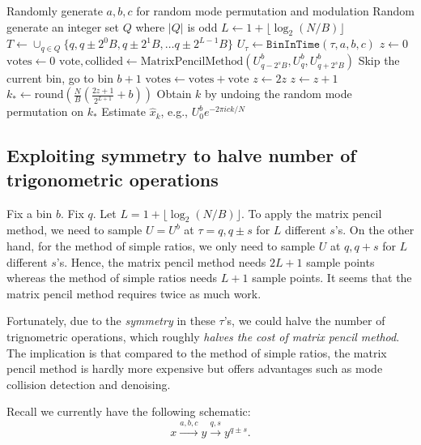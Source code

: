 \documentclass[10pt]{article}
\begin{document}
\begin{algorithmic}[1]
\State Randomly generate $a,b,c$ for random mode permutation and modulation
\State Random generate an integer set $Q$ where $|Q|$ is odd
\State $L \leftarrow 1 + \lfloor \log_2(N/B) \rfloor$
\State $T\leftarrow \cup_{q\in Q} \{q, q \pm 2^0 B, q \pm 2^1 B, \ldots q \pm 2^{L-1} B \}$
  \State $U_\tau \leftarrow \texttt{BinInTime}(\tau, a, b, c)$
\EndFor
{}
  \State $z\leftarrow 0$
    \State $\text{votes} \leftarrow 0$
      \State $\text{vote}, \text{collided} \leftarrow \text{MatrixPencilMethod}(U^b_{q-2^s B}, U^b_q, U^b_{q+2^s B})$
      	\State Skip the current bin, go to bin $b+1$
      \EndIf
      \State $\text{votes} \leftarrow \text{votes} + \text{vote}$
    \EndFor
    \State $z \leftarrow 2z$
      \State $z \leftarrow z + 1$
    \EndIf
  \EndFor
  \State $k_* \leftarrow \text{round}( \frac{N}{B}(\frac{2z+1}{2^{L+1}} + b))$
  \State Obtain $k$ by undoing the random mode permutation on $k_*$
  \State Estimate $\hat{x}_k$, e.g., $U^b_0 e^{-2\pi i c k/N}$
\EndFor
\end{algorithmic}

\subsection{Exploiting symmetry to halve number of trigonometric operations}\label{sec:symmetry}

Fix a bin $b$. Fix $q$. Let $L=1+\lfloor \log_2(N/B) \rfloor$. To apply the matrix pencil method, we need to sample $U=U^b$ at $\tau=q, q\pm s$ for $L$ different $s$'s. On the other hand, for the method of simple ratios, we only need to sample $U$ at $q, q+s$ for $L$ different $s$'s. Hence, the matrix pencil method needs $2L+1$ sample points whereas the method of simple ratios needs $L+1$ sample points. It seems that the matrix pencil method requires twice as much work.

Fortunately, due to the \emph{symmetry} in these $\tau$'s, we could halve the number of trignometric operations, which roughly \emph{halves the cost of matrix pencil method}. The implication is that compared to the method of simple ratios, the matrix pencil method is hardly more expensive but offers advantages such as mode collision detection and denoising.

Recall we currently have the following schematic:
$$x \xrightarrow{a,b,c}{y} \xrightarrow{q,s} y^{q\pm s}.$$
\end{document}
